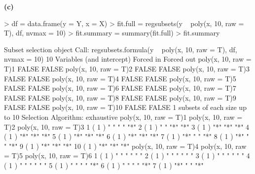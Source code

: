 \documentclass[a4paper]{article}
\renewcommand{\part}[1] {\vspace{.10in} {\bf (#1)}}
\begin{document}
\part{c}
\begin{Schunk}
\begin{Sinput}
> df = data.frame(y = Y, x = X)
> fit.full = regsubsets(y ~ poly(x, 10, raw = T), df, nvmax = 10)
> fit.summary = summary(fit.full)
> fit.summary
\end{Sinput}
\begin{Soutput}
Subset selection object
Call: regsubsets.formula(y ~ poly(x, 10, raw = T), df, nvmax = 10)
10 Variables  (and intercept)
                       Forced in Forced out
poly(x, 10, raw = T)1      FALSE      FALSE
poly(x, 10, raw = T)2      FALSE      FALSE
poly(x, 10, raw = T)3      FALSE      FALSE
poly(x, 10, raw = T)4      FALSE      FALSE
poly(x, 10, raw = T)5      FALSE      FALSE
poly(x, 10, raw = T)6      FALSE      FALSE
poly(x, 10, raw = T)7      FALSE      FALSE
poly(x, 10, raw = T)8      FALSE      FALSE
poly(x, 10, raw = T)9      FALSE      FALSE
poly(x, 10, raw = T)10     FALSE      FALSE
1 subsets of each size up to 10
Selection Algorithm: exhaustive
          poly(x, 10, raw = T)1 poly(x, 10, raw = T)2 poly(x, 10, raw = T)3
1  ( 1 )  " "                   " "                   "*"                  
2  ( 1 )  " "                   "*"                   "*"                  
3  ( 1 )  "*"                   "*"                   "*"                  
4  ( 1 )  "*"                   "*"                   "*"                  
5  ( 1 )  "*"                   "*"                   "*"                  
6  ( 1 )  "*"                   "*"                   "*"                  
7  ( 1 )  "*"                   " "                   "*"                  
8  ( 1 )  "*"                   " "                   "*"                  
9  ( 1 )  "*"                   "*"                   "*"                  
10  ( 1 ) "*"                   "*"                   "*"                  
          poly(x, 10, raw = T)4 poly(x, 10, raw = T)5 poly(x, 10, raw = T)6
1  ( 1 )  " "                   " "                   " "                  
2  ( 1 )  " "                   " "                   " "                  
3  ( 1 )  " "                   " "                   " "                  
4  ( 1 )  " "                   " "                   " "                  
5  ( 1 )  " "                   " "                   "*"                  
6  ( 1 )  " "                   " "                   "*"                  
7  ( 1 )  "*"                   " "                   "*"                  

\end{Soutput}
\end{Schunk}
\end{document}
